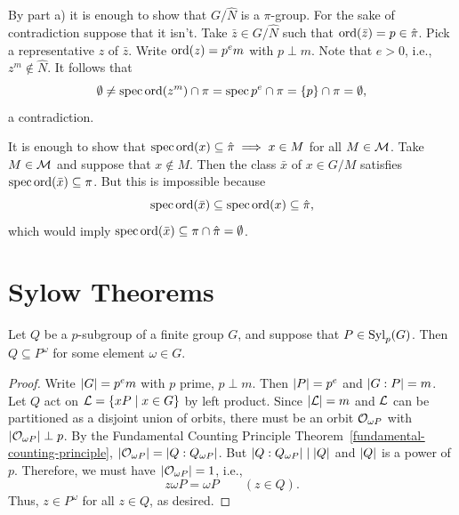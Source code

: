 \begin{solution}
\begin{enumerate}[\upshape a)]
    \begin{description}[leftmargin=!,labelwidth=\widthof{$\hat N$:}]
    \item[$\hat N\supseteq N$:]
        By part a) it is enough to show that $G/\hat N$ is a $\pi$-group. For the sake of contradiction suppose that it isn't. Take $\bar z\in G/\hat N$ such that ${\rm ord}(\bar z)=p\in\hat\pi$. Pick a representative $z$ of $\bar z$. Write ${\rm ord}(z)=p^em$ with $p\perp m$. Note that $e>0$, i.e., $z^m\notin\hat N$. It follows that
        $$
            \emptyset\ne\operatorname{spec}{\rm ord}(z^m)\cap\pi=\operatorname{spec}p^e\cap\pi
                =\{p\}\cap\pi=\emptyset,
        $$
        a contradiction.
      \item[$\hat N\subseteq N$:] It is enough to show that $\operatorname{spec}{\rm ord}(x)\subseteq\hat\pi\implies x\in M$ for all $M\in\cal M$. Take $M\in\cal M$ and suppose that $x\notin M$. Then the class $\bar x$ of $x\in G/M$ satisfies $\operatorname{spec}{\rm ord}(\bar x)\subseteq\pi$. But this is impossible because
      $$
        \operatorname{spec}{\rm ord}(\bar x)\subseteq\operatorname{spec}{\rm ord}(x)\subseteq\hat\pi,
      $$
      which would imply $\operatorname{spec}{\rm ord}(\bar x)\subseteq\pi\cap\hat\pi=\emptyset$.
  \end{description}
\end{enumerate}
\end{solution}


\section{Sylow Theorems}

\begin{thm}\label{sylow-pre-d}
    Let $Q$ be a $p$-subgroup of a finite group $G$, and suppose that $P \in{\rm Syl}_p(G)$. Then $Q \subseteq P^\omega$ for some element $\omega\in G$.
\end{thm}

\begin{proof} Write $\left\vert{G}\right\vert=p^em$ with $p$ prime, $p\perp m$. Then $\left\vert{P}\right\vert=p^e$ and $\left\vert{G:P}\right\vert=m$. Let $Q$ act on ${\cal L}=\{xP\mid x\in G\}$ by left product. Since $\left\vert{\cal L}\right\vert=m$ and $\cal L$ can be partitioned as a disjoint union of orbits, there must be an orbit ${\cal O}_{\omega P}$ with $\left\vert{{\cal O}_{\omega P}}\right\vert\perp p$. By the Fundamental Counting Principle Theorem~\ref{fundamental-counting-principle}, $\left\vert{{\cal O}_{\omega P}}\right\vert=\left\vert{Q:Q_{\omega P}}\right\vert$. But $\left\vert{Q:Q_{\omega P}}\right\vert\mid\left\vert{Q}\right\vert$ and $\left\vert{Q}\right\vert$ is a power of $p$. Therefore, we must have $\left\vert{{\cal O}_{\omega P}}\right\vert=1$, i.e.,
$$
    z\omega P=\omega P\qquad(z\in Q).
$$
Thus, $z\in P^\omega$ for all $z\in Q$, as desired.  \end{proof}

